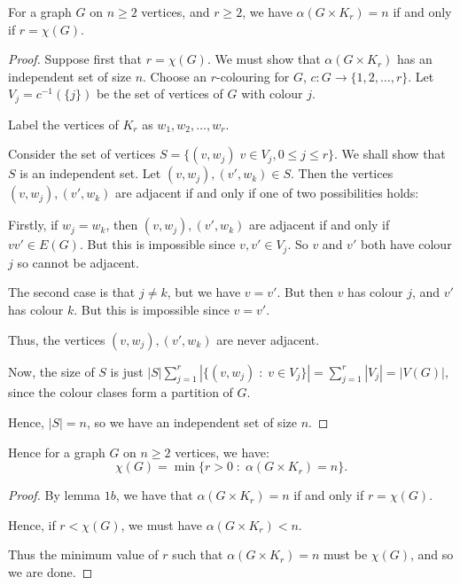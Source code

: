 \documentclass{unswmaths}
\begin{document}
\begin{lemma}[Part (b)]
\label{1b}
    For a graph $G$ on $n \geq 2$ vertices, and $r \geq 2$, we have
    $\alpha(G\times K_r) = n$ if and only if $r = \chi(G)$.
\end{lemma}
\begin{proof}
    Suppose first that $r = \chi(G)$. We must show that $\alpha(G\times K_r)$
    has an independent set of size $n$. Choose an $r$-colouring
    for $G$, $c:G\to \{1,2,\ldots,r\}$. Let $V_j = c^{-1}(\{j\})$
    be the set of vertices of $G$ with colour $j$.
       
    Label the vertices of $K_r$ as $w_1,w_2,\ldots, w_r$. 
    
    Consider the set of vertices $S = \{(v,w_j)\;v \in V_j, 0 \leq j \leq r\}$.
    We shall show that $S$ is an independent set. Let $(v,w_j), (v',w_k) \in S$. 
    Then the vertices $(v,w_j),(v',w_k)$ are adjacent if and only if one of
    two possibilities holds:
    
    Firstly, if $w_j = w_k$, then $(v,w_j),(v',w_k)$ are adjacent
    if and only if $vv' \in E(G)$. But this is impossible since $v,v' \in V_j$.
    So $v$ and $v'$ both have colour $j$ so cannot be adjacent.
    
    The second case is that $j \neq k$, but we have $v = v'$. But then
    $v$ has colour $j$, and $v'$ has colour $k$. But this is impossible
    since $v = v'$.
    
    Thus, the vertices $(v,w_j),(v',w_k)$ are never adjacent.
    
    Now, the size of $S$ is just $|S| \sum_{j = 1}^r |\{(v,w_j)\;:\;v \in V_j\}| = \sum_{j=1}^r |V_j| = |V(G)|$,
    since the colour clases form a partition of $G$.
    
    Hence, $|S| = n$, so we have an independent set of size $n$.    
\end{proof}

\begin{corollary}[Part (c)]
    Hence for a graph $G$ on $n\geq 2$ vertices, we have:
    \begin{equation*}
        \chi(G) = \min\{r > 0\;:\;\alpha(G\times K_r) = n\}.
    \end{equation*}
\end{corollary}
\begin{proof}
    By lemma $1b$, we have that $\alpha(G\times K_r) = n$ if and only
    if $r = \chi(G)$. 
    
    Hence, if $r < \chi(G)$, we must have $\alpha(G\times K_r) < n$. 
    
    Thus the minimum value of $r$ such that $\alpha(G\times K_r) = n$
    must be $\chi(G)$, and so we are done.
\end{proof} 
\end{document}
